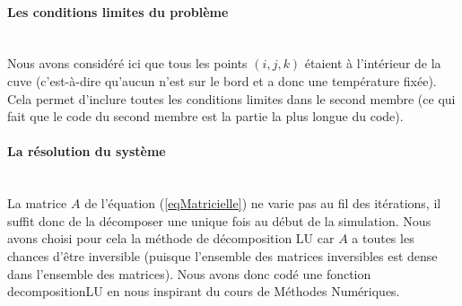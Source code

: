 \documentclass[../PS6_RapportFinal.tex]{subfiles}
\begin{document}
\paragraph{Les conditions limites du problème}
~\\
\indent Nous avons considéré ici que tous les points $(i,j,k)$ étaient à l'intérieur de la cuve (c'est-à-dire qu'aucun n'est sur le bord et a donc une température fixée). Cela permet d'inclure toutes les conditions limites dans le second membre (ce qui fait que le code du second membre est la partie la plus longue du code).


\paragraph{La résolution du système}
~\\
\indent La matrice $A$ de l'équation (\ref{eqMatricielle}) ne varie pas au fil des itérations, il suffit donc de la décomposer une unique fois au début de la simulation. Nous avons choisi pour cela la méthode de décomposition LU car $A$ a toutes les chances d'être inversible (puisque l'ensemble des matrices inversibles est dense dans l'ensemble des matrices). Nous avons donc codé une fonction decompositionLU en nous inspirant du cours de Méthodes Numériques.
\end{document}
